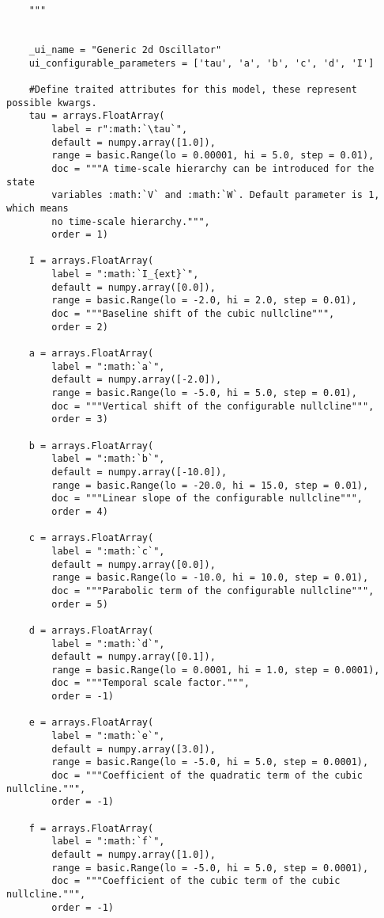 \documentclass{article}
\begin{document}
\begin{lstlisting}
    """


    _ui_name = "Generic 2d Oscillator"
    ui_configurable_parameters = ['tau', 'a', 'b', 'c', 'd', 'I']

    #Define traited attributes for this model, these represent possible kwargs.
    tau = arrays.FloatArray(
        label = r":math:`\tau`",
        default = numpy.array([1.0]),
        range = basic.Range(lo = 0.00001, hi = 5.0, step = 0.01),
        doc = """A time-scale hierarchy can be introduced for the state 
        variables :math:`V` and :math:`W`. Default parameter is 1, which means
        no time-scale hierarchy.""",
        order = 1)

    I = arrays.FloatArray(
        label = ":math:`I_{ext}`",
        default = numpy.array([0.0]),
        range = basic.Range(lo = -2.0, hi = 2.0, step = 0.01),
        doc = """Baseline shift of the cubic nullcline""",
        order = 2)

    a = arrays.FloatArray(
        label = ":math:`a`",
        default = numpy.array([-2.0]),
        range = basic.Range(lo = -5.0, hi = 5.0, step = 0.01),
        doc = """Vertical shift of the configurable nullcline""",
        order = 3)

    b = arrays.FloatArray(
        label = ":math:`b`",
        default = numpy.array([-10.0]),
        range = basic.Range(lo = -20.0, hi = 15.0, step = 0.01),
        doc = """Linear slope of the configurable nullcline""",
        order = 4)

    c = arrays.FloatArray(
        label = ":math:`c`",
        default = numpy.array([0.0]),
        range = basic.Range(lo = -10.0, hi = 10.0, step = 0.01),
        doc = """Parabolic term of the configurable nullcline""",
        order = 5)
        
    d = arrays.FloatArray(
        label = ":math:`d`",
        default = numpy.array([0.1]),
        range = basic.Range(lo = 0.0001, hi = 1.0, step = 0.0001),
        doc = """Temporal scale factor.""",
        order = -1)
        
    e = arrays.FloatArray(
        label = ":math:`e`",
        default = numpy.array([3.0]),
        range = basic.Range(lo = -5.0, hi = 5.0, step = 0.0001),
        doc = """Coefficient of the quadratic term of the cubic nullcline.""",
        order = -1)
        
    f = arrays.FloatArray(
        label = ":math:`f`",
        default = numpy.array([1.0]),
        range = basic.Range(lo = -5.0, hi = 5.0, step = 0.0001),
        doc = """Coefficient of the cubic term of the cubic nullcline.""",
        order = -1)
        

\end{lstlisting}
\end{document}
